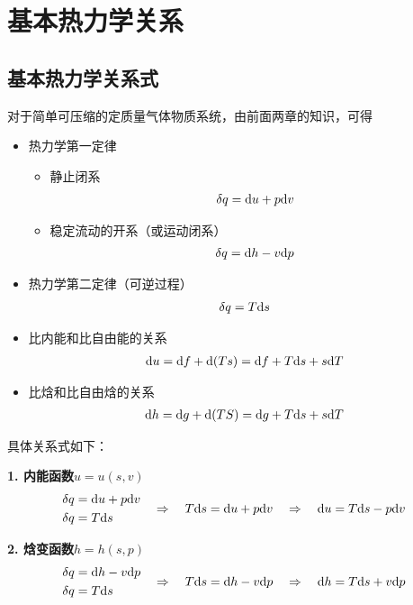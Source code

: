\section{基本热力学关系}
\subsection{基本热力学关系式}
对于简单可压缩的定质量气体物质系统，由前面两章的知识，可得
\begin{itemize}
	\item 热力学第一定律
	\begin{itemize}
		\item 静止闭系\vspace*{-1em}
		\begin{align}
			\delta q = {\rm{d}} u +p {\rm{d}} v
		\end{align}
		\item 稳定流动的开系（或运动闭系）\vspace*{-1em}
		\begin{align}
			\delta q = {\rm{d}} h - v {\rm{d}} p
		\end{align}
	\end{itemize}
	\item 热力学第二定律（可逆过程）\vspace*{-1em}
	\begin{align}
		\delta q = T {\rm{d}} s
	\end{align}
	\item 比内能和比自由能的关系
	\begin{align}
		{\rm{d}} u = {\rm{d}} f + {\rm{d}} (Ts) = {\rm{d}} f + T {\rm{d}} s + s {\rm{d}} T 
	\end{align}
	
	\item 比焓和比自由焓的关系
	\begin{align}
		{\rm{d}} h = {\rm{d}} g + {\rm{d}} (TS) = {\rm{d}} g + T {\rm{d}} s + s {\rm{d}} T
	\end{align}
\end{itemize}
具体关系式如下：

\textbf{1. 内能函数$u = u(s,v)$}
\begin{align}
	\begin{aligned}
		\delta q &= {\rm{d}} u + p {\rm{d}} v\\
		\delta q &= T {\rm{d}} s
	\end{aligned}
\quad \Rightarrow \quad 
T {\rm{d}} s = {\rm{d}} u + p {\rm{d}} v
\quad \Rightarrow \quad 
{\rm{d}} u = T {\rm{d}} s - p {\rm{d}} v
\end{align}

\textbf{2. 焓变函数$h = h(s,p)$}
\begin{align}
	\begin{aligned}
		\delta q &= {\rm{d}} h - v {\rm{d}} p\\
		\delta q &= T {\rm{d}} s
	\end{aligned}
	\quad \Rightarrow \quad 
	T {\rm{d}} s = {\rm{d}} h - v {\rm{d}} p
	\quad \Rightarrow \quad 
	{\rm{d}} h = T {\rm{d}} s + v {\rm{d}} p
\end{align}

